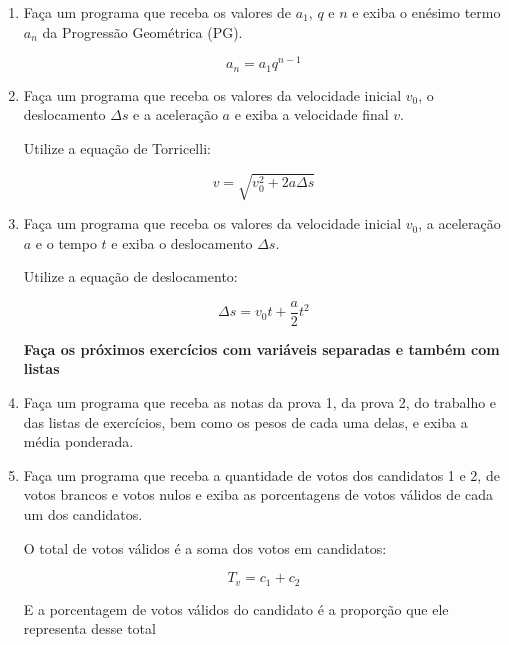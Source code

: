 \begin{enumerate}
	\begin{equation*}
		a_n = a_1 + r(n - 1)
	\end{equation*}

	\item Faça um programa que receba os valores de $a_1$, $q$ e $n$ e exiba o enésimo termo $a_n$ da Progressão Geométrica (PG).
	
	\begin{equation*}
		a_n = a_1q^{n - 1}
	\end{equation*}
	
	\item Faça um programa que receba os valores da velocidade inicial $v_0$, o deslocamento $\Delta s$ e a aceleração $a$ e exiba a velocidade final $v$.
	
	Utilize a equação de Torricelli:
	
	\begin{equation*}
		v = \sqrt{v_0^2 + 2 a \Delta s}
	\end{equation*}
	
	\item Faça um programa que receba os valores da velocidade inicial $v_0$, a aceleração $a$ e o tempo $t$ e exiba o deslocamento $\Delta s$.
	
	Utilize a equação de deslocamento:
	
	\begin{equation*}
		\Delta s = v_0 t + \frac{a}{2}t^2 
	\end{equation*}
	
\quebra	

	\textbf{Faça os próximos exercícios com variáveis separadas e também com listas}

	\item Faça um programa que receba 
	as notas da prova 1, da prova 2, 
	do trabalho e das listas de exercícios, 
	bem como os pesos de cada uma delas,  
	e exiba a média ponderada.
	
\quebra	

	\item Faça um programa que receba a quantidade de votos dos candidatos 1 e 2, de votos brancos e votos nulos e exiba as porcentagens de votos válidos de cada um dos candidatos.
	
	O total de votos válidos é a soma dos votos em candidatos:
	
	\begin{equation*}
		T_v = c_1 + c_2
	\end{equation*} 
	
	E a porcentagem de votos válidos do candidato é a proporção que ele representa desse total
	

\end{enumerate}
